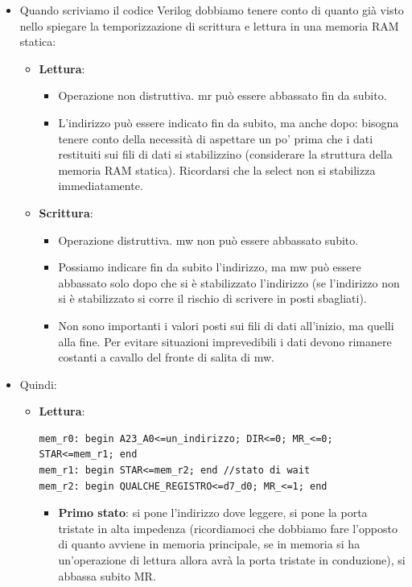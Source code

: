 \documentclass[11pt]{report}
\begin{document}
\begin{itemize}
\item Quando scriviamo il codice Verilog dobbiamo tenere conto di quanto già visto nello spiegare la temporizzazione di scrittura e lettura in una memoria RAM statica:
\begin{itemize}
\item \textbf{Lettura}:
\begin{itemize}
\item Operazione non distruttiva. mr può essere abbassato fin da subito.
\item L'indirizzo può essere indicato fin da subito, ma anche dopo: bisogna tenere conto della necessità di aspettare un po' prima che i dati restituiti sui fili di dati si stabilizzino (considerare la struttura della memoria RAM statica). Ricordarsi che la select non si stabilizza immediatamente. 
\end{itemize}
\item \textbf{Scrittura}:
\begin{itemize}
\item Operazione distruttiva. mw non può essere abbassato subito.
\item Possiamo indicare fin da subito l'indirizzo, ma mw può essere abbassato solo dopo che si è stabilizzato l'indirizzo (se l'indirizzo non si è stabilizzato si corre il rischio di scrivere in posti sbagliati).
\item Non sono importanti i valori posti sui fili di dati all'inizio, ma quelli alla fine. Per evitare situazioni imprevedibili i dati devono rimanere costanti a cavallo del fronte di salita di mw.
\end{itemize}
\end{itemize}
\item Quindi:
\begin{itemize}
\item \textbf{Lettura}:
\begin{verbatim}
mem_r0: begin A23_A0<=un_indirizzo; DIR<=0; MR_<=0; STAR<=mem_r1; end
mem_r1: begin STAR<=mem_r2; end //stato di wait
mem_r2: begin QUALCHE_REGISTRO<=d7_d0; MR_<=1; end
\end{verbatim}
\begin{itemize}
\item \textbf{Primo stato}: si pone l'indirizzo dove leggere, si pone la porta tristate in alta impedenza (ricordiamoci che dobbiamo fare l'opposto di quanto avviene in memoria principale, se in memoria si ha un'operazione di lettura allora avrà la porta tristate in conduzione), si abbassa subito MR.

\end{itemize}
\end{itemize}
\end{itemize}
\end{document}
